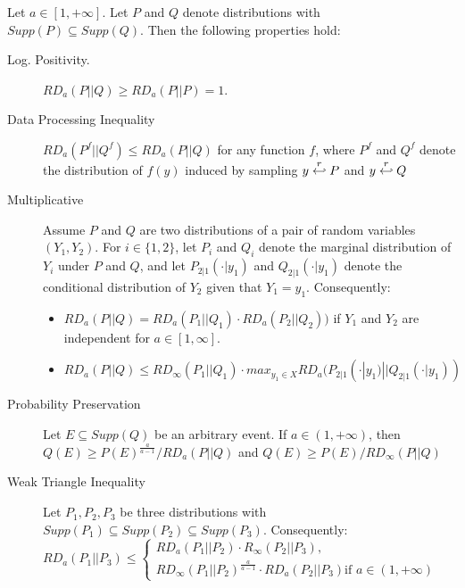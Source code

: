 \begin{lemma}
  Let \(a \in [1, +\infty]\). Let \(P\) and \(Q\) denote distributions with
  \(Supp(P) \subseteq Supp(Q)\). Then the following properties hold:
  \begin{description}
  \item [Log. Positivity.] \(RD_{a}(P || Q) \geq RD_{a}(P||P) = 1\).
  \item[Data Processing Inequality]
    \(RD_{a}(P^{f} || Q^{f}) \leq RD_{a}(P || Q)\) for any function \(f\), where
    \(P^{f}\) and \(Q^{f}\) denote the distribution of \(f(y)\) induced by
    sampling \(y \stackrel{r}{\hookleftarrow} P\) and \(y \stackrel{r}{\hookleftarrow} Q\)
  \item[Multiplicative] Assume \(P\) and \(Q\) are two distributions of a pair
    of random variables \((Y_{1}, Y_{2})\). For \(i \in \{1,2\}\), let \(P_{i}\)
    and \(Q_{i}\) denote the marginal distribution of \(Y_{i}\) under \(P\) and
    \(Q\), and let \(P_{2|1}(\cdot | y_{1})\) and \(Q_{2|1}(\cdot | y_{1})\)
    denote the conditional distribution of \(Y_{2}\) given that
    \(Y_{1} = y_{1}\). Consequently:
    \begin{itemize}
    \item \(RD_{a}(P||Q) = RD_{a}(P_{1}||Q_{1}) \cdot RD_{a}(P_{2}||Q_{2}))\) if
    \(Y_{1}\) and \(Y_{2}\) are independent for \(a \in [1,\infty]\).
    \item
    \(RD_{a}(P||Q) \leq RD_{\infty}(P_{1} || Q_{1}) \cdot max_{y_{1} \in X}
    RD_{a}(P_{2|1}(\cdot | y_{1})||Q_{2|1}(\cdot | y_{1}))\)
    \end{itemize}
  \item[Probability Preservation] Let \(E \subseteq Supp(Q)\) be an arbitrary
    event. If \(a \in (1, +\infty)\), then
    \(Q(E) \geq P(E)^{\frac{a}{a-1}}/RD_{a}(P||Q)\) and
    \(Q(E) \geq P(E)/RD_{\infty}(P||Q)\)
  \item[Weak Triangle Inequality] Let \(P_{1}, P_{2}, P_{3}\) be three
    distributions with
    \(Supp(P_{1}) \subseteq Supp(P_{2}) \subseteq Supp(P_{3})\). Consequently:\\
    \(RD_{a}(P_{1}||P_{3}) \leq
    \begin{cases}
      RD_{a}(P_{1}||P_{2}) \cdot R_{\infty}(P_{2}||P_{3}),\\
      RD_{\infty}(P_{1}||P_{2})^{\frac{a}{a-1}} \cdot RD_{a}(P_{2}||P_{3})
      \text{if } a \in (1,+\infty)
    \end{cases}
\)
  \end{description}
\end{lemma}

